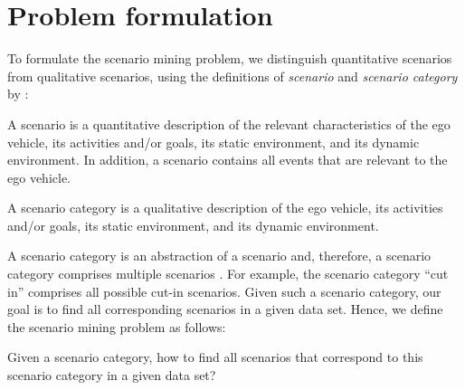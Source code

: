 \section{Problem formulation}
\label{sec:problem}

To formulate the scenario mining problem, we distinguish quantitative scenarios from qualitative scenarios, using the definitions of \emph{scenario} and \emph{scenario category} by \textcite{degelder2018ontology}:

\begin{definition}
	\label{def:scenario}
	A scenario is a quantitative description of the relevant characteristics of the ego vehicle, its activities and/or goals, its static environment, and its dynamic environment. In addition, a scenario contains all events that are relevant to the ego vehicle.
\end{definition}

\begin{definition}
	\label{def:scenario category}
	A scenario category is a qualitative description of the ego vehicle, its activities and/or goals, its static environment, and its dynamic environment.
\end{definition}

\cstarta
A scenario category is an abstraction of a scenario and, therefore, a scenario category comprises multiple scenarios \autocite{degelder2018ontology}.
For example, the scenario category ``cut in'' comprises all possible cut-in scenarios. 
Given such a scenario category, our goal is to find all corresponding scenarios in a given data set. 
Hence, we define the scenario mining problem as follows:
\begin{problem}
	Given a scenario category, how to find all scenarios that correspond to this scenario category in a given data set?
\end{problem}
\cenda

